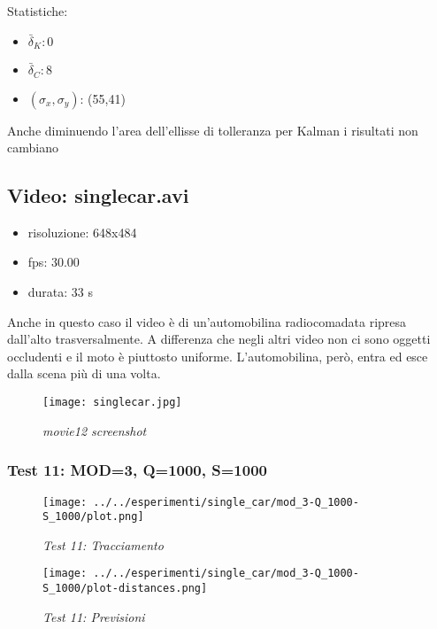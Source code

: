 Statistiche:
\begin{itemize}
\item \begin{math} \bar \delta_K: 0 \end{math}
\item \begin{math} \bar \delta_C: 8 \end{math}
\item \begin{math}(\sigma_x,\sigma_y)\end{math}: (55,41)
\end{itemize}

Anche diminuendo l'area dell'ellisse di tolleranza per Kalman i risultati non cambiano

\newpage
\subsection{Video: singlecar.avi}

\begin{itemize}
\item risoluzione: 648x484
\item fps: 30.00
\item durata: 33 s
\end{itemize}

Anche in questo caso il video è di un'automobilina radiocomadata ripresa dall'alto trasversalmente. A differenza che negli altri video non ci sono oggetti occludenti e il moto è piuttosto uniforme. L'automobilina, però, entra ed esce dalla scena più di una volta.

\begin{figure}[hb]
\centering
	\texttt{[image: singlecar.jpg]}
\caption{\textit{movie12 screenshot}}
\end{figure}

\newpage
\subsubsection{Test 11: MOD=3, Q=1000, S=1000}

\begin{figure}[hb]
\centering
\texttt{[image: ../../esperimenti/single\_car/mod\_3-Q\_1000-S\_1000/plot.png]}
\caption{\textit{Test 11: Tracciamento}}
\end{figure}

\begin{figure}[hb]
\centering
\texttt{[image: ../../esperimenti/single\_car/mod\_3-Q\_1000-S\_1000/plot-distances.png]}
\caption{\textit{Test 11: Previsioni}}
\end{figure}

